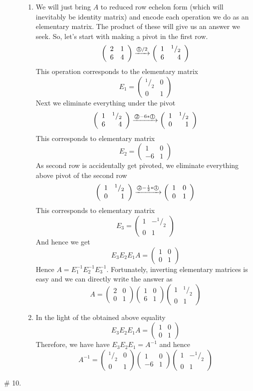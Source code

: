 \documentclass[8pt]{article} %
\newcommand{\myexplain}[3]{#1\xrightarrow{\text{#2}}#3}
\newcommand{\myfrac}[2]{^#1/_#2}
\begin{document}
\begin{description}
{\begin{enumerate}[label=(\alph*)]
		\newcommand{\mymat}[1]{\left(\begin{array}{rr}#1\end{array}\right)}
			\item We will just bring $A$ to reduced row echelon form (which will inevitably be identity matrix) and
				encode each operation we do as an elementary matrix. The product of these will give us an answer we
				seek. So, let's start with making a pivot in the first row.
				\[\myexplain
				{\mymat{2&1\\6&4}}
				{\textcircled{1}$/2$}
				{\mymat{1&\myfrac{1}{2}\\6&4}}
				\]
				This operation corresponds to the elementary matrix \[E_1=\mymat{\myfrac{1}{2}&0\\0&1}\]
				Next we eliminate everything under the pivot
				\[\myexplain
				{\mymat{1&\myfrac{1}{2}\\6&4}}
				{\textcircled{2}$-6*$\textcircled{1}}
				{\mymat{1&\myfrac{1}{2}\\0&1}}
				\]
				This corresponds to elementary matrix \[E_2=\mymat{1&0\\-6&1}\]
				As second row is accidentally get pivoted, we eliminate everything above pivot of the second row
				\[\myexplain
				{\mymat{1&\myfrac{1}{2}\\0&1}}
				{\textcircled{2}$-\frac{1}{2}*$\textcircled{1}}
				{\mymat{1&0\\0&1}}
				\]
				This corresponds to elementary matrix \[E_3=\mymat{1&-\myfrac{1}{2}\\0&1}\]
				And hence we get
				\[E_3E_2E_1A=\mymat{1&0\\0&1}\]
				Hence $A=E_1^{-1}E_2^{-1}E_3^{-1}$. Fortunately, inverting elementary matrices is easy and we can
				directly write the answer as
				\[A=\mymat{2&0\\0&1}\mymat{1&0\\6&1}\mymat{1&\myfrac{1}{2}\\0&1}\]
			\item In the light of the obtained above equality 
				\[E_3E_2E_1A=\mymat{1&0\\0&1}\]
				Therefore, we have have $E_3E_2E_1=A^{-1}$ and hence
				\[A^{-1}=\mymat{\myfrac{1}{2}&0\\0&1}\mymat{1&0\\-6&1}\mymat{1&-\myfrac{1}{2}\\0&1}\]
		\end{enumerate}
		}
	\item[\# 10.]{
		\newcommand{\mymat}[1]{\left(\begin{array}[t]{rr}#1\end{array}\right)}
}
\end{description}
\end{document}
